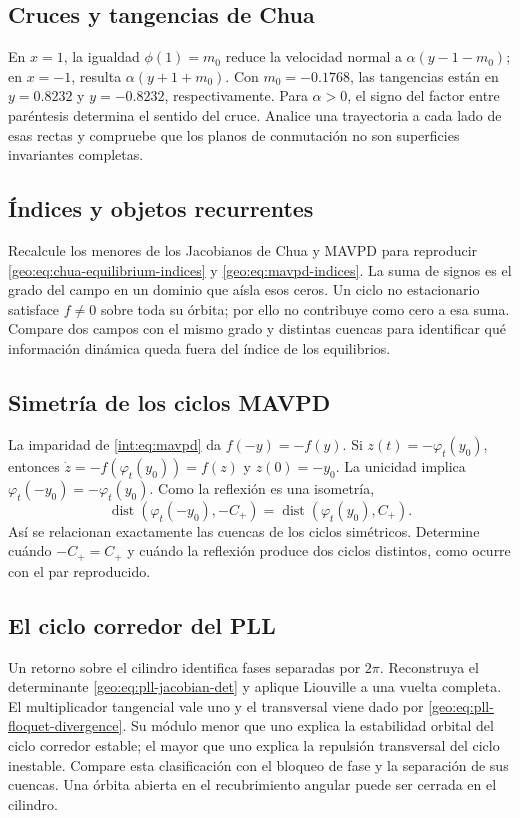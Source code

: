 \subsection{Cruces y tangencias de Chua}
En \(x=1\), la igualdad \(\phi(1)=m_0\) reduce la velocidad normal a
\(\alpha(y-1-m_0)\); en \(x=-1\), resulta
\(\alpha(y+1+m_0)\). Con \(m_0=-0.1768\), las tangencias están en
\(y=0.8232\) y \(y=-0.8232\), respectivamente. Para \(\alpha>0\), el
signo del factor entre paréntesis determina el sentido del cruce. Analice
una trayectoria a cada lado de esas rectas y compruebe que los planos de
conmutación no son superficies invariantes completas.

\subsection{Índices y objetos recurrentes}
Recalcule los menores de los Jacobianos de Chua y MAVPD para reproducir
\eqref{geo:eq:chua-equilibrium-indices} y \eqref{geo:eq:mavpd-indices}.
La suma de signos es el grado del campo en un dominio que aísla esos ceros.
Un ciclo no estacionario satisface \(f\ne0\) sobre toda su órbita; por ello
no contribuye como cero a esa suma. Compare dos campos con el mismo grado y
distintas cuencas para identificar qué información dinámica queda fuera del
índice de los equilibrios.

\subsection{Simetría de los ciclos MAVPD}
La imparidad de \eqref{int:eq:mavpd} da \(f(-y)=-f(y)\). Si
\(z(t)=-\varphi_t(y_0)\), entonces
\(\dot z=-f(\varphi_t(y_0))=f(z)\) y \(z(0)=-y_0\).
La unicidad implica \(\varphi_t(-y_0)=-\varphi_t(y_0)\). Como la reflexión
es una isometría,
\[
 \operatorname{dist}(\varphi_t(-y_0),-C_+)
 =\operatorname{dist}(\varphi_t(y_0),C_+).
\]
Así se relacionan exactamente las cuencas de los ciclos simétricos.
Determine cuándo \(-C_+=C_+\) y cuándo la reflexión produce dos ciclos
distintos, como ocurre con el par reproducido.

\subsection{El ciclo corredor del PLL}
Un retorno sobre el cilindro identifica fases separadas por \(2\pi\).
Reconstruya el determinante \eqref{geo:eq:pll-jacobian-det} y aplique
Liouville a una vuelta completa. El multiplicador tangencial vale uno y el
transversal viene dado por \eqref{geo:eq:pll-floquet-divergence}. Su módulo
menor que uno explica la estabilidad orbital del ciclo corredor estable;
el mayor que uno explica la repulsión transversal del ciclo inestable.
Compare esta clasificación con el bloqueo de fase y la separación de sus
cuencas. Una órbita abierta en el recubrimiento angular puede ser cerrada
en el cilindro.

